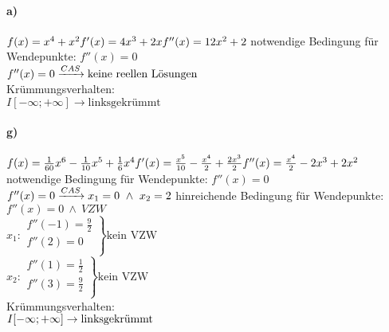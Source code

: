 \documentclass[arbeitsmappe.tex]{subfiles}
\begin{document}
    \paragraph{a)}
    $
    f(x) = x^4 + x^2 \\
    f'(x) = 4x^3 + 2x \\
    f''(x) = 12x^2 + 2 \\
    $
    notwendige Bedingung für Wendepunkte: $f''(x) = 0$ \\
    $
    f''(x) = 0 \\
    \xrightarrow{CAS} \text{keine reellen L\"osungen}
    $
    \\
    Krümmungsverhalten: \\
    $
    I[-\infty; +\infty] \to \text{linksgekrümmt}
    $

    \paragraph{g)}
    $
    f(x) = \frac{1}{60}x^6 - \frac{1}{10}x^5 + \frac{1}{6}x^4 \\
    f'(x) = \frac{x^5}{10} - \frac{x^4}{2} + \frac{2x^3}{2} \\
    f''(x) = \frac{x^4}{2} - 2x^3 + 2x^2 \\
    $
    notwendige Bedingung für Wendepunkte: $f''(x) = 0$ \\
    $
    f''(x) = 0 \\
    \xrightarrow{CAS} x_1 = 0\ \land\ x_2 = 2 \\
    $
    hinreichende Bedingung für Wendepunkte: $f''(x) = 0\ \land\ VZW$ \\
    $
    \left.
    x_1:
    \begin{array}{ll}
        f''(-1) = \frac{9}{2} \\
        f''(2) = 0            \\
    \end{array}
    \right\} \text{kein VZW}
    $
    \\
    $
    \left.
    x_2:
    \begin{array}{ll}
        f''(1) = \frac{1}{2} \\
        f''(3) = \frac{9}{2} \\
    \end{array}
    \right\} \text{kein VZW}
    $
    \\
    Krümmungsverhalten: \\
    $
    I[-\infty; +\infty] \to \text{linksgekrümmt} \\
    $
    \newpage
\end{document}
